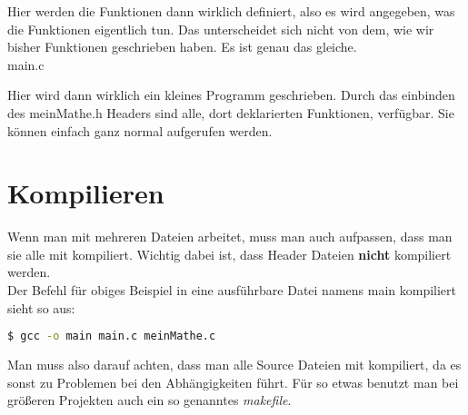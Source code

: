 \documentclass[c_worksheet.tex]{subfiles}
\begin{document}
Hier werden die Funktionen dann wirklich definiert, also es wird angegeben, was die Funktionen eigentlich tun. Das unterscheidet sich nicht von dem, wie wir bisher Funktionen geschrieben haben. Es ist genau das gleiche.\\

main.c



Hier wird dann wirklich ein kleines Programm geschrieben. Durch das einbinden des meinMathe.h Headers sind alle, dort deklarierten Funktionen, verfügbar. Sie können einfach ganz normal aufgerufen werden. 


\section{Kompilieren}

Wenn man mit mehreren Dateien arbeitet, muss man auch aufpassen, dass man sie alle mit kompiliert. Wichtig dabei ist, dass Header Dateien \textbf{nicht} kompiliert werden.\\

Der Befehl für obiges Beispiel in eine ausführbare Datei namens main kompiliert sieht so aus:

\begin{lstlisting}[language=bash]
$ gcc -o main main.c meinMathe.c
\end{lstlisting} 

Man muss also darauf achten, dass man alle Source Dateien mit kompiliert, da es sonst zu Problemen bei den Abhängigkeiten führt. Für so etwas benutzt man bei größeren Projekten auch ein so genanntes \emph{makefile}.
\end{document}
